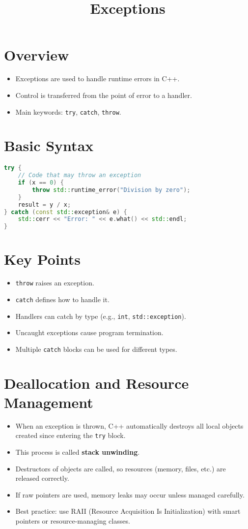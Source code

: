 \documentclass{article}
\title{Exceptions}
\author{}
\date{}
\begin{document}
\maketitle


\section{Overview}
\begin{itemize}
    \item Exceptions are used to handle runtime errors in C++.
    \item Control is transferred from the point of error to a handler.
    \item Main keywords: \texttt{try}, \texttt{catch}, \texttt{throw}.
\end{itemize}

\section{Basic Syntax}
\begin{lstlisting}[language=C++]
try {
    // Code that may throw an exception
    if (x == 0) {
        throw std::runtime_error("Division by zero");
    }
    result = y / x;
} catch (const std::exception& e) {
    std::cerr << "Error: " << e.what() << std::endl;
}
\end{lstlisting}

\section{Key Points}
\begin{itemize}
    \item \texttt{throw} raises an exception.
    \item \texttt{catch} defines how to handle it.
    \item Handlers can catch by type (e.g., \texttt{int}, \texttt{std::exception}).
    \item Uncaught exceptions cause program termination.
    \item Multiple \texttt{catch} blocks can be used for different types.
\end{itemize}

\section{Deallocation and Resource Management}
\begin{itemize}
    \item When an exception is thrown, C++ automatically destroys all local objects
          created since entering the \texttt{try} block.
    \item This process is called \textbf{stack unwinding}.
    \item Destructors of objects are called, so resources (memory, files, etc.)
          are released correctly.
    \item If raw pointers are used, memory leaks may occur unless managed carefully.
    \item Best practice: use RAII (Resource Acquisition Is Initialization) with
          smart pointers or resource-managing classes.
\end{itemize}
\end{document}
